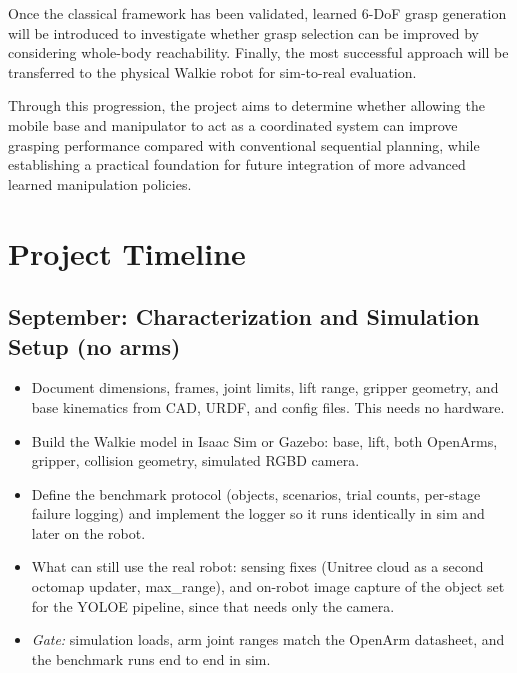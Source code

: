 \documentclass[12pt,a4paper]{article}
\begin{document}
Once the classical framework has been validated, learned 6-DoF grasp generation will be
introduced to investigate whether grasp selection can be improved by considering whole-body
reachability. Finally, the most successful approach will be transferred to the physical Walkie
robot for sim-to-real evaluation.

Through this progression, the project aims to determine whether allowing the mobile
base and manipulator to act as a coordinated system can improve grasping performance
compared with conventional sequential planning, while establishing a practical foundation for
future integration of more advanced learned manipulation policies.

\section*{Project Timeline}

\subsection*{September: Characterization and Simulation Setup (no arms)}
\begin{itemize}
  \item Document dimensions, frames, joint limits, lift range, gripper geometry, and base
        kinematics from CAD, URDF, and config files. This needs no hardware.
  \item Build the Walkie model in Isaac Sim or Gazebo: base, lift, both OpenArms, gripper,
        collision geometry, simulated RGBD camera.
  \item Define the benchmark protocol (objects, scenarios, trial counts, per-stage failure
        logging) and implement the logger so it runs identically in sim and later on the robot.
  \item What can still use the real robot: sensing fixes (Unitree cloud as a second octomap
        updater, max\_range), and on-robot image capture of the object set for the YOLOE
        pipeline, since that needs only the camera.
  \item \textit{Gate:} simulation loads, arm joint ranges match the OpenArm datasheet, and the
        benchmark runs end to end in sim.
\end{itemize}
\end{document}
